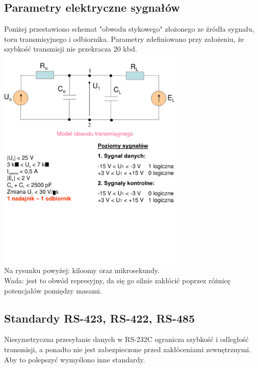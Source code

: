 	\subsection{Parametry elektryczne sygnałów}
	Poniżej przestawiono schemat "obwodu stykowego" złożonego ze źródła sygnału, toru transmisyjnego i odbiornika. Parametry zdefiniowano przy założeniu, że szybkość transmisji nie przekracza 20 kbd.
	\includegraphics[width=9cm]{./wyklady/RS232_10_1.pdf}\\
	Na rysunku powyżej: kiloomy oraz mikrosekundy.\\
	Wada: jest to obwód represyjny, da się go silnie zakłócić poprzez różnicę potencjałów pomiędzy masami.
	\subsection{Standardy RS-423, RS-422, RS-485}
	Niesymetryczna przesyłanie danych w RS-232C ogranicza szybkość i odległość transmisji, a ponadto nie jest zabezpieczone przed zakłóceniami zewnętrznymi. Aby to polepszyć wymyślono inne standardy.

